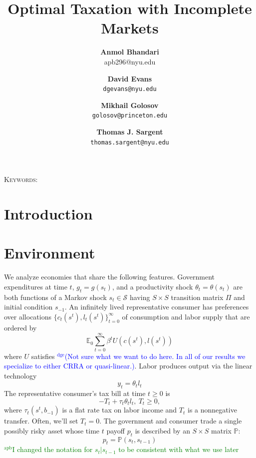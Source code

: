 \documentclass[12pt]{article}
\title {Optimal Taxation with Incomplete Markets}
\author{\textbf{Anmol Bhandari}\\apb296@nyu.edu \and \textbf{David Evans} \\ \texttt{dgevans@nyu.edu} \and \textbf{Mikhail Golosov}\\\texttt{golosov@princeton.edu} \and \textbf{Thomas J. Sargent} \\ \texttt{thomas.sargent@nyu.edu}
}
\newcommand{\dge}[1]{\textcolor{blue}{$^{\textrm{dge}}${#1}}}
\newcommand{\apb}[1]{\textcolor{green}{$^{\textrm{apb}}${#1}}}
\begin{document}
\maketitle



\begin{abstract}

\end{abstract}


\noindent\textsc{Keywords:}
\section{Introduction}


\section{Environment}



We analyze economies that share the following features.
Government expenditures at time $t$, $g_t=g(s_t)$, and a productivity shock $\theta_t=\theta(s_t)$ are both functions of
  a Markov  shock $s_t\in \mathcal{S}$ having  $S \times S$ transition matrix $\Pi$ and initial condition $s_{-1}$.
An infinitely lived representative consumer has preferences over allocations  $\{c_t(s^t), l_t(s^t)\}_{t=0}^\infty$ of consumption and labor supply that are ordered
by
   \begin{equation*}
\mathbb{E}_{0}\sum_{t=0}^{\infty } \beta^t  U\left(
c(s^t),l(s^t)\right)  \label{utility lifetime}
\end{equation*}%
where $U$ satisfies \dge{(Not sure what we want to do here.  In all of our results we specialize to either CRRA or quasi-linear.)}.
  Labor produces output via the linear technology
  \begin{equation*}
  y_t=\theta_{t} l_{t} \end{equation*}
The representative consumer's tax bill
 at time $t \geq 0$ is
 \[- T_t + \tau_t \theta_{t}l_{t},  \ T_t \geq 0, \]
 where $\tau_t(s^t, b_{-1})$ is a flat rate tax on labor income and $T_t$ is a nonnegative transfer.
 Often, we'll set $T_t =0$.
The government and consumer trade a single  possibly risky  asset whose  time $t$ payoff $p_t$ is described by an $S \times S$ matrix $\mathbb{P}$:
\[p_t=\mathbb{P}(s_{t},s_{t-1}) \]
\apb{I changed the notation for $s_t|s_{t-1}$ to be consistent with what we use later}
\end{document}
